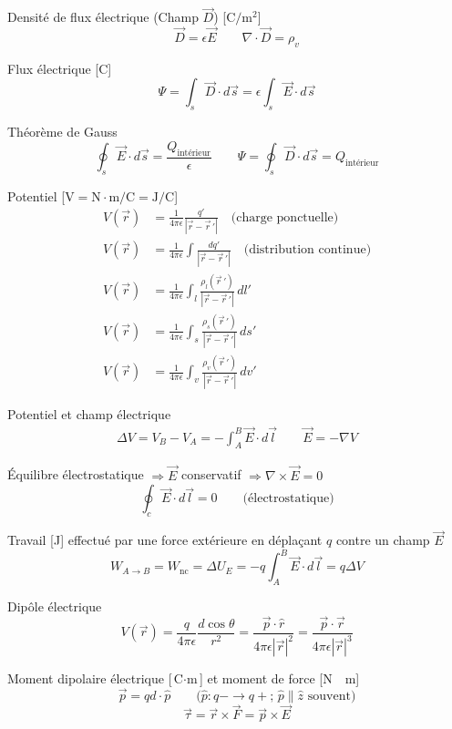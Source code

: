 \documentclass[10pt,landscape]{article}
\newcommand{\uvec}[1]{\ensuremath{{\hat{#1}}}}
\begin{document}
\begin{multicols}{3}
Densité de flux électrique (Champ $\vec{D}$)  [$\si{\coulomb/\metre^2}$]
\[ \vec{D} = \epsilon\vec{E}
\qquad \nabla \cdot \vec{D} = \rho_v \]

Flux électrique [\si{\coulomb}]
\[  \Psi = \int_{s} \vec{D} \cdot d\vec{s} = \epsilon \int_{s} \vec{E} \cdot d\vec{s} \]

Théorème de Gauss
\[ \oint_s \vec{E}\cdot d\vec{s} = \frac{Q_\text{intérieur}}{\epsilon}
\qquad  \Psi = \oint_s \vec{D}\cdot d\vec{s} = Q_\text{intérieur} \]

Potentiel [$\si{\volt} = \si{\newton\cdot\metre/\coulomb} = \si{\joule/\coulomb}$]
\begin{align*}
V(\vec{r}) &= \frac{1}{4\pi\epsilon}  \frac{q'}{| \vec{r} - \vec{r}\,' | }  \quad \text{(charge ponctuelle)}\\
V(\vec{r}) &= \frac{1}{4\pi\epsilon} \int \frac{dq'}{| \vec{r} - \vec{r}\,' | }  \quad \text{(distribution continue)} \\
% 
V(\vec{r}) &= \frac{1}{4\pi\epsilon} \int_{l} \frac{\rho_l(\vec{r}\,')}{| \vec{r} - \vec{r}\,' | } \,dl' 
\\ 
V(\vec{r}) &= \frac{1}{4\pi\epsilon} \int_{s} \frac{\rho_s(\vec{r}\,')}{| \vec{r} - \vec{r}\,'| } \,ds'  \\
V(\vec{r}) &= \frac{1}{4\pi\epsilon} \int_{v} \frac{\rho_v(\vec{r}\,')}{| \vec{r} - \vec{r}\,' | } \,dv'  
\end{align*}

Potentiel et champ électrique
\begin{gather*}
\Delta V = V_B - V_A  = -\int_A^B \vec{E}\cdot d\vec{l} \qquad
 \vec{E} = -\nabla V
\end{gather*}

Équilibre électrostatique $\Rightarrow \vec{E}$ conservatif  $\Rightarrow \nabla \times \vec{E} = 0$
\[  \oint_c \vec{E}\cdot d\vec{l}  = 0 \qquad \text{(électrostatique)}\]

Travail [\si{\joule}] effectué par une force extérieure en déplaçant $q$ contre un champ $\vec{E}$
\[ W_{A\to B} = W_\text{nc} = \Delta U_E = -q\int_{A}^{B} \vec{E}\cdot d\vec{l} = q\Delta V \]

Dipôle électrique
\[ V(\vec{r}) = \frac{q}{4\pi\epsilon} \frac{d\cos\theta}{r^2} =
\frac{\vec{p}\cdot\uvec{r}}{4\pi\epsilon|\vec{r}|^2} =
\frac{\vec{p}\cdot\vec{r}}{4\pi\epsilon|\vec{r}|^3} \]

Moment dipolaire électrique [$\si{\coulomb\cdot\meter}$] et moment de force [\si{\newton\cdot\metre}]
\[ \vec{p} = qd\cdot \uvec{p} \qquad \text{($\uvec{p}: q- \to q+$;  $\uvec{p}\parallel\uvec{z}$ souvent)} \]
\[ \vec\tau = \vec{r}\times\vec{F} = \vec{p}\times\vec{E} \]


\end{multicols}
\end{document}
